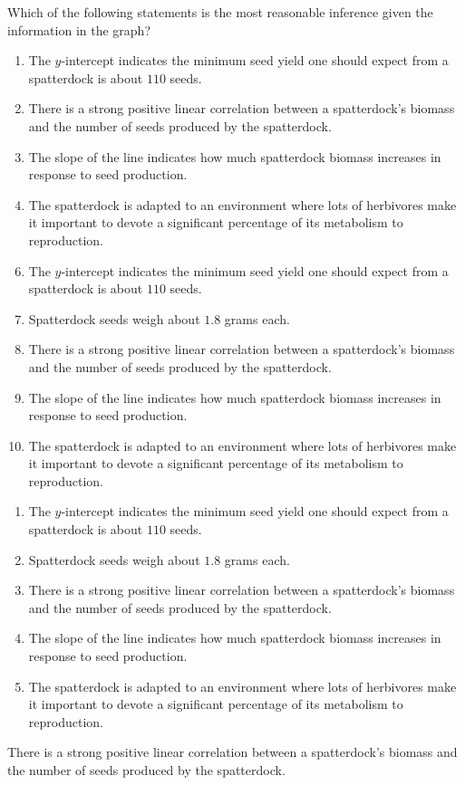  
Which of the following statements is the most reasonable inference given the information in the graph?


\ifsat
	\begin{enumerate}[label=\Alph*)]
		\item The $y$-intercept indicates the minimum seed yield one should expect from a spatterdock is about $110$ seeds.
		\item There is a strong positive linear correlation between a spatterdock's biomass and the number of seeds produced by the spatterdock. %
		\item The slope of the line indicates how much spatterdock biomass increases in response to seed production.
		\item The spatterdock is adapted to an environment where lots of herbivores make it important to devote a significant percentage of its metabolism to reproduction.
	\end{enumerate}
\else
\fi

\ifacteven
	\begin{enumerate}[label=\textbf{\Alph*.},itemsep=\fill,align=left]
		\setcounter{enumii}{5}
		\item The $y$-intercept indicates the minimum seed yield one should expect from a spatterdock is about $110$ seeds.
		\item Spatterdock seeds weigh about $1.8$ grams each.
		\item There is a strong positive linear correlation between a spatterdock's biomass and the number of seeds produced by the spatterdock. %
		\addtocounter{enumii}{1}
		\item The slope of the line indicates how much spatterdock biomass increases in response to seed production.
		\item The spatterdock is adapted to an environment where lots of herbivores make it important to devote a significant percentage of its metabolism to reproduction.
	\end{enumerate}
\else
\fi

\ifactodd
	\begin{enumerate}[label=\textbf{\Alph*.},itemsep=\fill,align=left]
		\item The $y$-intercept indicates the minimum seed yield one should expect from a spatterdock is about $110$ seeds.
		\item Spatterdock seeds weigh about $1.8$ grams each.
		\item There is a strong positive linear correlation between a spatterdock's biomass and the number of seeds produced by the spatterdock. %
		\item The slope of the line indicates how much spatterdock biomass increases in response to seed production.
		\item The spatterdock is adapted to an environment where lots of herbivores make it important to devote a significant percentage of its metabolism to reproduction.
	\end{enumerate}
\else
\fi

\ifgridin
 There is a strong positive linear correlation between a spatterdock's biomass and the number of seeds produced by the spatterdock. %
		
\else
\fi

